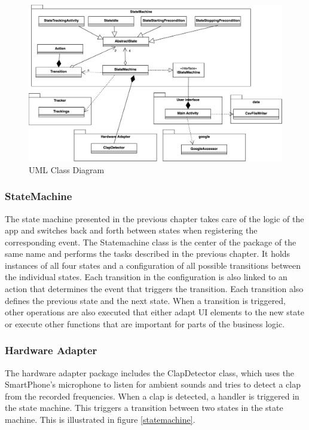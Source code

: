 \begin{figure}[H]
	\centering
	\includegraphics[width=1.0\linewidth]{./imgs/classUML.png}
	\caption[Caption for LOF]{UML Class Diagram}
	\label{class-diagram}
\end{figure}

\subsubsection{StateMachine}
\label{sec:org9ea54c6}

The state machine presented in the previous chapter takes care of the logic 
of the app and switches back and forth between states when registering the corresponding event. 
The Statemachine class is the center of the package of the same name and performs the tasks described in the previous chapter.
It holds instances of all four states and a configuration of all possible transitions between the individual states.
Each transition in the configuration is also linked to an action that determines the event that triggers 
the transition. Each transition also defines the previous state and the next state.
When a transition is triggered, other operations are also executed that either adapt UI elements to the new 
state or execute other functions that are important for parts of the business logic.

\subsubsection{Hardware Adapter}
\label{sec:org0a1c43f}
The hardware adapter package includes the ClapDetector class, which uses the SmartPhone's microphone to listen 
for ambient sounds and tries to detect a clap from the recorded frequencies. When a clap is detected, 
a handler is triggered in the state machine. This triggers a transition between two states in the state machine.
This is illustrated in figure \ref{statemachine}.

